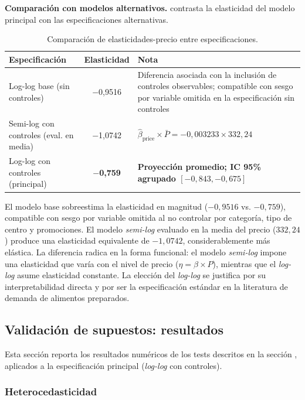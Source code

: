 \documentclass[doc, a4paper, biblatex, floatsintext, longtable, babel]{apa7}
\begin{document}
\textbf{Comparaci\'on con modelos alternativos.}  contrasta la elasticidad del modelo principal con las especificaciones alternativas.

\begin{table}[!htbp]
\centering
\caption{Comparaci\'on de elasticidades-precio entre especificaciones.}
\label{tab:comparacion_elasticidades}
\begin{tabular}{lcp{4.5cm}}
\toprule
Especificaci\'on & Elasticidad & Nota \\
\midrule
Log-log base (sin controles) & $-$0,9516 & Diferencia asociada con la inclusión de controles observables; compatible con sesgo por variable omitida en la especificación sin controles \\
Semi-log con controles (eval. en media) & $-$1,0742 & $\hat{\beta}_{\text{price}} \times \bar{P} = -0,003233 \times 332,24$ \\
Log-log con controles (principal) & \textbf{$-$0,759} & \textbf{Proyección promedio; IC 95\% agrupado $[-0,843,-0,675]$} \\
\bottomrule
\end{tabular}
\end{table}

El modelo base sobreestima la elasticidad en magnitud ($-0,9516$ vs. $-0,759$), compatible con sesgo por variable omitida al no controlar por categor\'ia, tipo de centro y promociones. El modelo \textit{semi-log} evaluado en la media del precio ($332,24$) produce una elasticidad equivalente de $-1,0742$, considerablemente m\'as el\'astica. La diferencia radica en la forma funcional: el modelo \textit{semi-log} impone una elasticidad que var\'ia con el nivel de precio ($\eta = \beta \times P$), mientras que el \textit{log-log} asume elasticidad constante. La elecci\'on del \textit{log-log} se justifica por su interpretabilidad directa y por ser la especificaci\'on est\'andar en la literatura de demanda de alimentos preparados.

\subsection{Validaci\'on de supuestos: resultados}
\label{sec:validacion}

Esta secci\'on reporta los resultados num\'ericos de los tests descritos en la secci\'on , aplicados a la especificaci\'on principal (\textit{log-log} con controles).

\subsubsection{Heterocedasticidad}
\label{subsec:heterocedasticidad}
\end{document}
